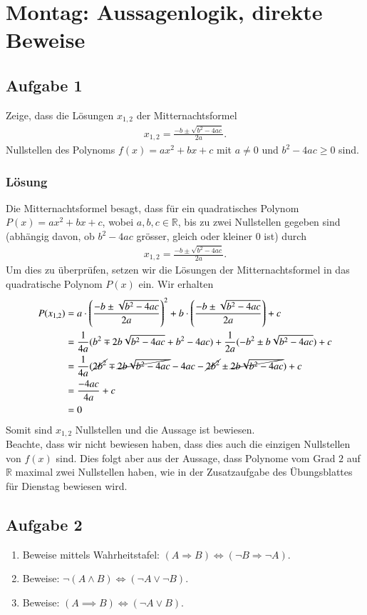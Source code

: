 \documentclass[a4paper,10pt]{article}
\newcommand{\R}{\mathbb{R}}
\newcommand{\s}[1]{#1}
\begin{document}
\section*{Montag: Aussagenlogik, direkte Beweise}

\subsection*{Aufgabe 1}
Zeige, dass die Lösungen $x_{1,2}$ der Mitternachtsformel
\begin{align*}
    x_{1,2}=\frac{-b\pm \sqrt{b^2-4ac}}{2a}.
\end{align*}
Nullstellen des Polynoms $f(x) = ax^2 + bx + c$ mit $a\neq 0$ und $b^2-4ac\geq 0$ sind.

\s{\subsubsection*{Lösung}
Die Mitternachtsformel besagt, dass für ein quadratisches Polynom $P(x)=ax^2+bx+c$, wobei $a,b,c\in \R$, bis zu zwei Nullstellen gegeben sind (abhängig davon, ob $b^2-4ac$ grösser, gleich oder kleiner $0$ ist) durch
\begin{align*}
    x_{1,2}=\frac{-b\pm \sqrt{b^2-4ac}}{2a}.
\end{align*}
Um dies zu überprüfen, setzen wir die Lösungen der Mitternachtsformel in das quadratische Polynom $P(x)$ ein. Wir erhalten
\begin{align*}
    P(x_{1,2}) &= a \cdot \left(\frac{-b\pm \sqrt{b^2-4ac}}{2a}\right)^2 + b\cdot \left(\frac{-b\pm \sqrt{b^2-4ac}}{2a}\right) + c \\
    &= \frac{1}{4a}(b^2\mp 2b\sqrt{b^2-4ac}+b^2-4ac) + \frac{1}{2a}(-b^2\pm b\sqrt{b^2-4ac}) + c \\
    &= \frac{1}{4a}(\cancel{2b^2}\mp \cancel{2b\sqrt{b^2-4ac}}-4ac-\cancel{2b^2}\pm \cancel{2b\sqrt{b^2-4ac}})+c\\
    &= \frac{-4ac}{4a}+c\\
    &= 0
\end{align*}
Somit sind $x_{1,2}$ Nullstellen und die Aussage ist bewiesen.\\
Beachte, dass wir nicht bewiesen haben, dass dies auch die einzigen Nullstellen von $f(x)$ sind. Dies folgt aber aus der Aussage, dass Polynome vom Grad $2$ auf $\R$ maximal zwei Nullstellen haben, wie in der Zusatzaufgabe des Übungsblattes für Dienstag bewiesen wird.
}

\subsection*{Aufgabe 2}
\begin{enumerate}[label=(\alph*)]
    \item Beweise mittels Wahrheitstafel: $(A \Rightarrow B) \Leftrightarrow (\neg B \Rightarrow \neg A)$.
    \item Beweise: $\neg (A \land B) \Leftrightarrow (\neg A \lor \neg B)$.
    \item Beweise: $(A\implies B) \Leftrightarrow (\neg A \lor B)$.
\end{enumerate}
\end{document}
